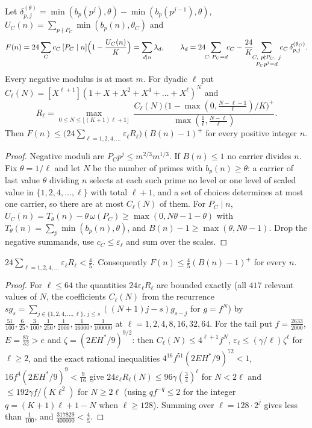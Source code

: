 \begin{lemma}\label{lem:h17-6}
Let $\delta^{(\theta)}_{p,j}=\min(b_p(p^j),\theta)-\min(b_p(p^{j-1}),\theta)$, $U_C(n)=\sum_{p\nmid P_C}\min(b_p(n),\theta_C)$ and
\[
F(n)=24\sum_Cc_C\,[P_C\mid n]\Bigl(1-\frac{U_C(n)}K\Bigr)
=\sum_{d\mid n}\lambda_d,\qquad
\lambda_d=24\!\!\sum_{C:\,P_C=d}\!\!c_C-\frac{24}K\!\!\sum_{\substack{C,\ p\nmid P_C,\ j\\ P_Cp^j=d}}\!\!c_C\,\delta^{(\theta_C)}_{p,j}.
\]
Every negative modulus is at most $m$. For dyadic $\ell$ put $C_\ell(N)=[X^{\ell+1}](1+X+X^2+X^4+\dots+X^\ell)^N$ and
\[
R_\ell=\max_{0\le N\le\lfloor(K+1)\ell+1\rfloor}\ \frac{C_\ell(N)\bigl(1-\max(0,\tfrac{N-\ell-1}\ell)/K\bigr)^+}{\max(\tfrac1\ell,\tfrac{N-\ell}\ell)} .
\]
Then $F(n)\le\bigl(24\sum_{\ell=1,2,4,\dots}\varepsilon_\ell R_\ell\bigr)(B(n)-1)^+$ for every positive integer $n$.
\end{lemma}
\begin{proof}
Negative moduli are $P_Cp^j\le m^{2/3}m^{1/3}$. If $B(n)\le1$ no carrier divides $n$. Fix $\theta=1/\ell$ and let $N$ be the
number of primes with $b_p(n)\ge\theta$: a carrier of last value $\theta$ dividing $n$ selects at each such prime no level or one
level of scaled value in $\{1,2,4,\dots,\ell\}$ with total $\ell+1$, and a set of choices determines at most one carrier, so
there are at most $C_\ell(N)$ of them. For $P_C\mid n$, $U_C(n)=T_\theta(n)-\theta\,\omega(P_C)\ge\max(0,N\theta-1-\theta)$ with
$T_\theta(n)=\sum_p\min(b_p(n),\theta)$, and $B(n)-1\ge\max(\theta,N\theta-1)$. Drop the negative summands, use
$c_C\le\varepsilon_\ell$ and sum over the scales.
\end{proof}

\begin{lemma}\label{lem:h17-7}
$24\sum_{\ell=1,2,4,\dots}\varepsilon_\ell R_\ell<\tfrac45$. Consequently $F(n)\le\tfrac45(B(n)-1)^+$ for every $n$.
\end{lemma}
\begin{proof}
For $\ell\le64$ the quantities $24\varepsilon_\ell R_\ell$ are bounded exactly (all $417$ relevant values of $N$, the
coefficients $C_\ell(N)$ from the recurrence $sg_s=\sum_{j\in\{1,2,4,\dots,\ell\},\,j\le s}((N+1)j-s)g_{s-j}$ for $g=f^N$) by
$\tfrac{51}{100},\tfrac6{25},\tfrac3{100},\tfrac1{250},\tfrac1{2000},\tfrac1{16000},\tfrac1{100000}$ at
$\ell=1,2,4,8,16,32,64$. For the tail put $f=\tfrac{2633}{2000}$, $E=\tfrac{87}{32}>e$ and $\zeta=(2EH^*/9)^{9/2}$: then
$C_\ell(N)\le4^{\ell+1}f^N$, $\varepsilon_\ell\le(\gamma/\ell)\zeta^\ell$ for $\ell\ge2$, and the exact rational inequalities
$4^{16}f^{51}(2EH^*/9)^{72}<1$, $16f^4(2EH^*/9)^9<\tfrac9{16}$ give $24\varepsilon_\ell R_\ell(N)\le96\gamma(\tfrac34)^\ell$
for $N<2\ell$ and $\le192\gamma f/(K\ell^2)$ for $N\ge2\ell$ (using $qf^{-q}\le2$ for the integer $q=(K+1)\ell+1-N$ when
$\ell\ge128$). Summing over $\ell=128\cdot2^j$ gives less than $\tfrac1{100}$, and $\tfrac{317829}{400000}<\tfrac45$.
\end{proof}

